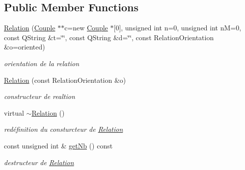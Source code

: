\subsection*{Public Member Functions}
\begin{DoxyCompactItemize}
\item 
\mbox{\label{classRelation_a6a53902d0bd49b31efa5a936047a8390}} 
\hyperlink{classRelation_a6a53902d0bd49b31efa5a936047a8390}{Relation} (\hyperlink{classCouple}{Couple} $\ast$$\ast$c=new \hyperlink{classCouple}{Couple} $\ast$\mbox{[}0\mbox{]}, unsigned int n=0, unsigned int nM=0, const Q\+String \&t=\char`\"{}\char`\"{}, const Q\+String \&d=\char`\"{}\char`\"{}, const Relation\+Orientation \&o=oriented)
\begin{DoxyCompactList}\small\item\em orientation de la relation \end{DoxyCompactList}\item 
\mbox{\label{classRelation_a3ad4dbad6baf6496ea0640ebb51ba43f}} 
\hyperlink{classRelation_a3ad4dbad6baf6496ea0640ebb51ba43f}{Relation} (const Relation\+Orientation \&o)
\begin{DoxyCompactList}\small\item\em constructeur de realtion \end{DoxyCompactList}\item 
\mbox{\label{classRelation_aac587ec926df3043c3eedcb5123be50b}} 
virtual \hyperlink{classRelation_aac587ec926df3043c3eedcb5123be50b}{$\sim$\+Relation} ()
\begin{DoxyCompactList}\small\item\em redéfinition du consturcteur de \hyperlink{classRelation}{Relation} \end{DoxyCompactList}\item 
\mbox{\label{classRelation_a1f1a261963dc4b12552024766707dea6}} 
const unsigned int \& \hyperlink{classRelation_a1f1a261963dc4b12552024766707dea6}{get\+Nb} () const
\begin{DoxyCompactList}\small\item\em destructeur de \hyperlink{classRelation}{Relation} \end{DoxyCompactList}\item 
\mbox{\label{classRelation_abed722c9a93e3ec386e2425a11f46a39}} 
$$
\end{DoxyCompactItemize}
